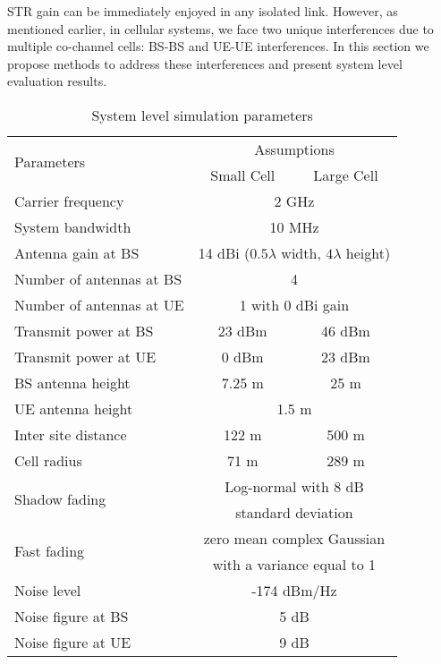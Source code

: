 \documentclass[twocolumn]{IEEEtran}
\begin{document}
STR gain can be immediately enjoyed in any isolated link. However,
as mentioned earlier, in cellular systems, we face two unique
interferences due to multiple co-channel cells: BS-BS and UE-UE
interferences. In this section we propose methods to address these
interferences and present system level evaluation results.


\begin{table}[ht]
\caption{System level simulation parameters}
\begin{small}
\begin{tabular}{l||c|c}
\hline
  \hline
\multirow{2}{*}{Parameters} &\multicolumn{2}{c}{Assumptions}   \\
    \cline{2-3}
   & Small Cell  & Large Cell \\
  \hline
  \hline
  Carrier frequency & \multicolumn{2}{c}{2 GHz}   \\
  \hline
  System bandwidth & \multicolumn{2}{c}{10 MHz}   \\
  \hline
  Antenna gain at BS & \multicolumn{2}{c}{14 dBi ($0.5\lambda$ width, $4\lambda$ height)}   \\
  \hline
  Number of antennas at BS & \multicolumn{2}{c}{4}   \\
   \hline
  Number of antennas at UE & \multicolumn{2}{c}{1 with 0 dBi gain}   \\
  \hline
  Transmit power at BS & 23 dBm & 46 dBm \\
  \hline
  Transmit power at UE & 0 dBm & 23 dBm \\
  \hline
  BS antenna height & 7.25 m & 25 m \\
  \hline
  UE antenna height & \multicolumn{2}{c}{1.5 m}  \\
  \hline
  Inter site distance & 122 m & 500 m \\
  \hline
  Cell radius & 71 m & 289 m \\
  \hline
  \multirow{2}{*}{Shadow fading} & \multicolumn{2}{c}{Log-normal with 8 dB}  \\
  &\multicolumn{2}{c}{standard deviation \cite{3gpp} } \\
  \hline
  \multirow{2}{*}{Fast fading} & \multicolumn{2}{c}{zero mean complex Gaussian}  \\
   & \multicolumn{2}{c}{with a variance equal to 1}  \\
  \hline
  Noise level & \multicolumn{2}{c}{-174 dBm/Hz}  \\
  \hline
  Noise figure at BS & \multicolumn{2}{c}{5 dB}  \\
  \hline
  Noise figure at UE & \multicolumn{2}{c}{9 dB}  \\
\hline \hline
\end{tabular}
\end{small}
\end{table}
\end{document}

